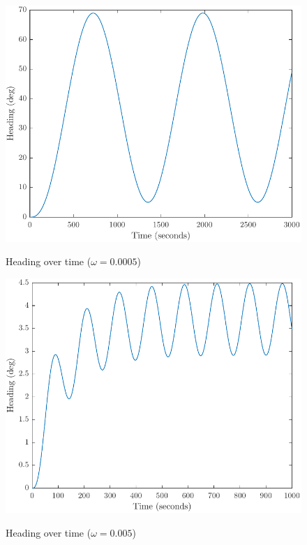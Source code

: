 \begin{figure}[ht]
    \centering
    \begin{minipage}[b]{0.48\textwidth}
        \includegraphics[width=\textwidth]{"images/1b-omega_lik_0005"}
        \label{fig:1b-omega=0.0005}
        \caption{Heading over time ($\omega = 0.0005$)}
    \end{minipage}
    \hfill
    \begin{minipage}[b]{0.48\textwidth}
        \includegraphics[width=\textwidth]{"images/1b-omega_lik_005"}
        \label{fig:1b-omega=0.005}
        \caption{Heading over time ($\omega = 0.005$)}
    \end{minipage}
\end{figure}

